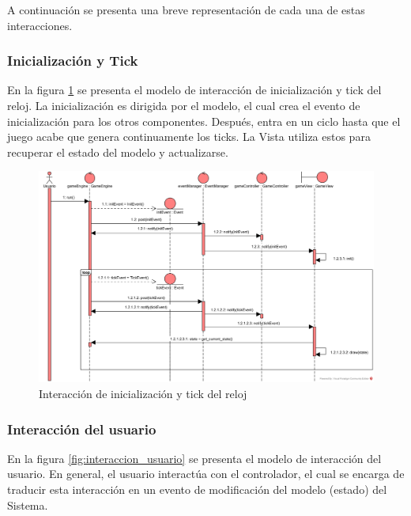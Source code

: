 \documentclass[letter,12pt]{article}
\begin{document}
A continuación se presenta una breve representación de cada una de estas interacciones. \par

\subsubsection{Inicialización y Tick} \label{diseño:interaccion:inicializacion_tick}

En la figura \ref{fig:interaccion_init_tick} se presenta el modelo de interacción de inicialización y tick del reloj. La inicialización es dirigida por el modelo, el cual crea el evento de inicialización para los otros componentes. Después, entra en un ciclo hasta que el juego acabe que genera continuamente los ticks. La Vista utiliza estos para recuperar el estado del modelo y actualizarse. \par

\begin{figure}[ht!]
	\centering
	\includegraphics[scale=0.6]{img/sd_init_tick.png}
	\caption{Interacción de inicialización y tick del reloj}
	\label{fig:interaccion_init_tick}
\end{figure}

\subsubsection{Interacción del usuario} \label{diseño:interaccion:usuario}

En la figura \ref{fig:interaccion_usuario} se presenta el modelo de interacción del usuario. En general, el usuario interactúa con el controlador, el cual se encarga de traducir esta interacción en un evento de modificación del modelo (estado) del Sistema. \par
\end{document}
